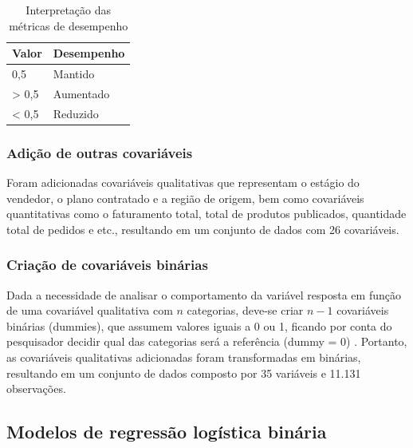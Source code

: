 \documentclass[twocolumn]{rbef}
\newcommand{\1}{\mathbbm{1}}
\begin{document}
\begin{table}

\caption{\label{tab:metricas}Interpretação das métricas de desempenho}
\centering
\fontsize{10}{12}\selectfont
\begin{tabular}[t]{ll}
\toprule
Valor & Desempenho\\
\midrule
0,5 & Mantido\\
> 0,5 & Aumentado\\
< 0,5 & Reduzido\\
\bottomrule
\end{tabular}
\end{table}

\hypertarget{adiuxe7uxe3o-de-outras-covariuxe1veis}{%
\subsubsection{Adição de outras covariáveis}\label{adiuxe7uxe3o-de-outras-covariuxe1veis}}

Foram adicionadas covariáveis qualitativas que representam o estágio do vendedor, o plano contratado e a região de origem, bem como covariáveis quantitativas como o faturamento total, total de produtos publicados, quantidade total de pedidos e etc., resultando em um conjunto de dados com 26 covariáveis.

\hypertarget{criauxe7uxe3o-de-covariuxe1veis-binuxe1rias}{%
\subsubsection{Criação de covariáveis binárias}\label{criauxe7uxe3o-de-covariuxe1veis-binuxe1rias}}

Dada a necessidade de analisar o comportamento da variável resposta em função de uma covariável qualitativa com \(n\) categorias, deve-se criar \(n-1\) covariáveis binárias (dummies), que assumem valores iguais a 0 ou 1, ficando por conta do pesquisador decidir qual das categorias será a referência (dummy = 0) \cite{Favero2017}. Portanto, as covariáveis qualitativas adicionadas foram transformadas em binárias, resultando em um conjunto de dados composto por 35 variáveis e 11.131 observações.

\hypertarget{modelos-de-regressuxe3o-loguxedstica-binuxe1ria}{%
\subsection{Modelos de regressão logística binária}\label{modelos-de-regressuxe3o-loguxedstica-binuxe1ria}}
\end{document}
